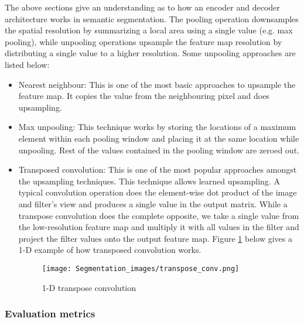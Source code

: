 The above sections give an understanding as to how an encoder and decoder architecture works in semantic segmentation. The pooling operation downsamples the spatial resolution by summarizing a local area using a single value (e.g. max pooling), while unpooling operations upsample the feature map resolution by distributing a single value to a higher resolution. Some unpooling approaches are listed below: 

\begin{itemize}
    \item Nearest neighbour: This is one of the most basic approaches to upsample the feature map. 
    It copies the value from the neighbouring pixel and does upsampling. 
    
    \item Max unpooling: This technique works by storing the locations of a maximum element within each pooling window and placing it at the same location while unpooling. Rest of the values contained in the pooling window are zeroed out.
    
    \item  Transposed convolution: This is one of the most popular approaches amongst the upsampling techniques. This technique allows learned upsampling. A typical convolution operation does the element-wise dot product of the image and filter's view and produces a single value in the output matrix. While a transpose convolution does the complete opposite, we take a single value from the low-resolution feature map and multiply it with all values in the filter and project the filter values onto the output feature map. Figure \ref{transpose convolution} below gives a 1-D example of how transposed convolution works. 
    
\begin{figure}[h!]
    \centering
    \texttt{[image: Segmentation\_images/transpose\_conv.png]}
    \caption{1-D transpose convolution \cite{JJ}}
    \label{transpose convolution}
\end{figure}

\end{itemize}

\newpage 

\subsubsection{Evaluation metrics}


